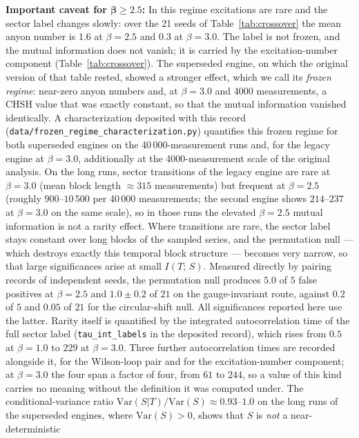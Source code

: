 \documentclass[aps,pra,twocolumn,superscriptaddress,showpacs,floatfix]{revtex4-2}
\newcommand{\MI}{I(T;\,S)}
\begin{document}
\textbf{Important caveat for $\bm{\beta \geq 2.5}$:} In this regime excitations are rare and the sector label changes slowly: over the 21 seeds of Table~\ref{tab:crossover} the mean anyon number is $1.6$ at $\beta = 2.5$ and $0.3$ at $\beta = 3.0$. The label is not frozen, and the mutual information does not vanish; it is carried by the excitation-number component (Table~\ref{tab:crossover}). The superseded engine, on which the original version of that table rested, showed a stronger effect, which we call its \emph{frozen regime}: near-zero anyon numbers and, at $\beta = 3.0$ and 4000 measurements, a CHSH value that was exactly constant, so that the mutual information vanished identically.
A characterization deposited with this record
(\texttt{data/frozen\_regime\_characterization.py}) quantifies this frozen regime for both superseded engines on the 40\,000-measurement runs and, for the legacy engine at $\beta = 3.0$, additionally at the 4000-measurement scale of the original analysis. On the long runs, sector transitions of the legacy engine are rare at $\beta = 3.0$ (mean block length ${\approx}315$
measurements) but frequent at $\beta = 2.5$ (roughly $900$--$10\,500$ per
40\,000 measurements; the second engine shows $214$--$237$ at $\beta = 3.0$ on
the same scale), so in those runs the elevated $\beta = 2.5$ mutual information is not a rarity effect. Where transitions are rare, the sector label stays constant over
long blocks of the sampled series, and the permutation null --- which destroys
exactly this temporal block structure --- becomes very narrow, so that large
significances arise at small $\MI$. Measured directly by pairing records of
independent seeds, the permutation null produces $5.0$ of $5$ false positives at
$\beta = 2.5$ and $1.0 \pm 0.2$ of $21$ on the gauge-invariant route, against
$0.2$ of $5$ and $0.05$ of $21$ for the circular-shift null. All significances
reported here use the latter. Rarity itself is quantified by the integrated
autocorrelation time of the full sector label
(\texttt{tau\_int\_labels} in the deposited record), which rises from $0.5$ at
$\beta = 1.0$ to $229$ at $\beta = 3.0$. Three further autocorrelation times
are recorded alongside it, for the Wilson-loop pair and for the
excitation-number component; at $\beta = 3.0$ the four span a factor of four,
from $61$ to $244$, so a value of this kind carries no meaning without the
definition it was computed under. The conditional-variance ratio
$\mathrm{Var}(S|T)/\mathrm{Var}(S) \approx 0.93$--$1.0$ on the long runs of the superseded engines,
where $\mathrm{Var}(S) > 0$, shows that $S$ is \emph{not} a near-deterministic
\end{document}
